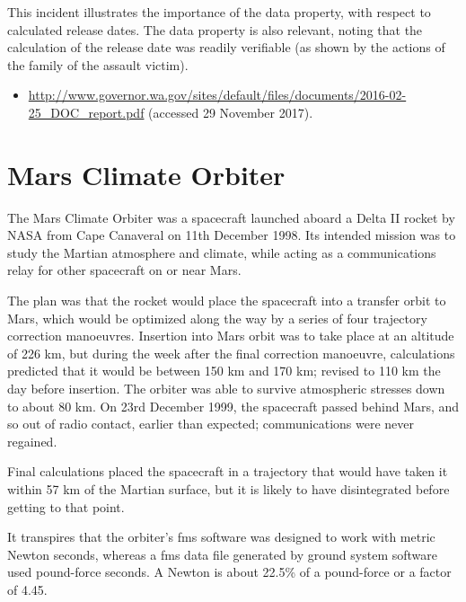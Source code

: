 This incident illustrates the importance of the  \gls{data property}, with respect to calculated release dates. The  \gls{data property} is also relevant, noting that the calculation of the release date was readily verifiable (as shown by the actions of the family of the assault victim).

\begin{samepage}
\begin{itemize}
	\item \raggedright{\href{http://www.governor.wa.gov/sites/default/files/documents/2016-02-25_DOC_report.pdf}{http://www.governor.wa.gov/sites/default/files/documents/2016-02-25\_DOC\_report.pdf} (accessed 29 November 2017).}
\end{itemize}
\end{samepage}


\section{Mars Climate Orbiter} \label{bkm:incacc:marsclimate}
The Mars Climate Orbiter was a spacecraft launched aboard a Delta II rocket by NASA from Cape Canaveral on 11th December 1998. Its intended mission was to study the Martian atmosphere and climate, while acting as a communications relay for other spacecraft on or near Mars.

The plan was that the rocket would place the spacecraft into a transfer orbit to Mars, which would be optimized along the way by a series of four trajectory correction manoeuvres. Insertion into Mars orbit was to take place at an altitude of 226 km, but during the week after the final correction manoeuvre, calculations predicted that it would be between 150 km and 170 km; revised to 110 km the day before insertion. The orbiter was able to survive atmospheric stresses down to about 80 km. On 23rd December 1999, the spacecraft passed behind Mars, and so out of radio contact, earlier than expected; communications were never regained.

Final calculations placed the spacecraft in a trajectory that would have taken it within 57 km of the Martian surface, but it is likely to have disintegrated before getting to that point. 

It transpires that the orbiter's \gls{fms} software was designed to work with metric Newton seconds, whereas a \gls{fms} data file generated by ground system software used pound-force seconds. A Newton is about 22.5\% of a pound-force or a factor of 4.45.

